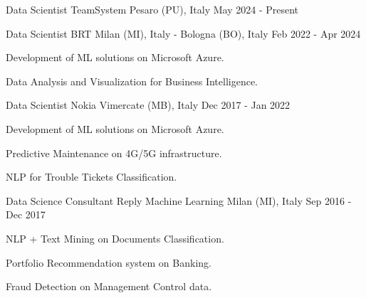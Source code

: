 

\begin{cventries}

  \cventry
    {Data Scientist} %
    {TeamSystem} %
    {Pesaro (PU), Italy} %
    {May 2024 - Present} %
    {
    }

  \cventry
    {Data Scientist} %
    {BRT} %
    {Milan (MI), Italy - Bologna (BO), Italy} %
    {Feb 2022 - Apr 2024} %
    {
      \begin{cvitems} %
        \item {Development of ML solutions on Microsoft Azure.}
        \item {Data Analysis and Visualization for Business Intelligence.}
      \end{cvitems}
    }

  \cventry
    {Data Scientist} %
    {Nokia} %
    {Vimercate (MB), Italy} %
    {Dec 2017 - Jan 2022} %
    {
     \begin{cvitems} %
        \item {Development of ML solutions on Microsoft Azure.}
        \item {Predictive Maintenance on 4G/5G infrastructure.}
        \item {NLP for Trouble Tickets Classification.}
      \end{cvitems}
    }

  \cventry
    {Data Science Consultant} %
    {Reply Machine Learning} %
    {Milan (MI), Italy} %
    {Sep 2016 - Dec 2017} %
    {
     \begin{cvitems} %
        \item {NLP + Text Mining on Documents Classification.}
        \item {Portfolio Recommendation system on Banking.}
        \item {Fraud Detection on Management Control data.}
      \end{cvitems}
    }


\end{cventries}
